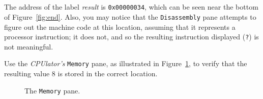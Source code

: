 \documentclass[epsfig,10pt,fullpage]{article}
\begin{document}
\begin{enumerate}
~\\
~\\
The address of the label {\it result} is \texttt{0x00000034}, which can be seen
near the bottom of Figure~\ref{fig:end}. Also, you may notice that the
\texttt{Disassembly} pane attempts to figure out the machine code at this location,
assuming that it represents a processor instruction; it does not, and so the resulting
instruction displayed (\texttt{?}) is not meaningful. 

Use the {\it CPUlator's} \texttt{Memory} pane, as illustrated in Figure~\ref{fig:memory},
to verify that the resulting value 8 is stored in the correct location.

\begin{figure}[H]
	\begin{center}
    \setlength{\fboxsep}{0pt}
	\end{center}
	\caption{The \texttt{Memory} pane.}
\label{fig:memory}
\end{figure} 


\end{enumerate}
\end{document}
